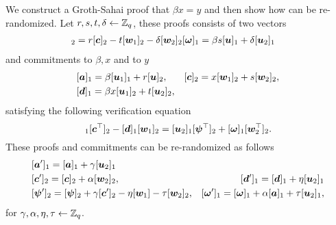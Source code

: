 
We construct a Groth-Sahai proof that $\beta x=y$ and then show how can be re-randomized. Let $r,s,t,\delta\gets\mathbb{Z}_q$, these proofs  consists of two vectors
\begin{align}
[&\vecb{\psi}]_2=r[\vecb{c}]_2-t[\vecb{w}_1]_2-\delta[\vecb{w}_2]_2 &[\vecb{\omega}]_1 =\beta s[\vecb{u}]_1+\delta[\vecb{u}_2]_1
\label{eq:wi-proofs}
\end{align}
and commitments to $\beta,x$ and to $y$
\begin{align*}
&[{\boldsymbol{a}}]_1 = \beta[{\boldsymbol{u}}_1]_1 + r[{\boldsymbol{u}}]_2, &[{\boldsymbol{c}}]_2= x[{\boldsymbol{w}}_1]_2+s[{\boldsymbol{w}}_2]_2,\\
&[{\boldsymbol{d}}]_1 =\beta x[{\boldsymbol{u}}_1]_2 + t[{\boldsymbol{u}}_2]_2,
\end{align*}
satisfying the following verification equation
\begin{equation}
[\vecb{a}]_1[\vecb{c}^\top]_2-[\vecb{d}]_1[\vecb{w}_1]_2 =[\vecb{u}_2]_1[\vecb{\psi}^\top]_2+[\vecb{\omega}]_1[\vecb{w}^\top_2]_2.
\label{eq:wi-verif}
\end{equation}
These proofs and commitments can be re-randomized as follows
\begin{align}
&[{\boldsymbol{a}}']_1 = [{\boldsymbol{a}}]_1 + \gamma[{\boldsymbol{u}}_2]_1 \nonumber\\
&[{\boldsymbol{c}}']_2= [{\boldsymbol{c}}]_2 + \alpha[{\boldsymbol{w}}_2]_2, &[{\boldsymbol{d}}']_1 =[{\boldsymbol{d}}]_1 + \eta[{\boldsymbol{u}}_2]_1 \nonumber\\
&[{\boldsymbol{\psi}}']_2=[{\boldsymbol{\psi}}]_2+\gamma[{\boldsymbol{c}}']_2 - \eta[{\boldsymbol{w}}_1]-\tau[{\boldsymbol{w}}_2]_2, & [{\boldsymbol{\omega}}']_1 = [{\boldsymbol{\omega}}]_1 + \alpha[{\boldsymbol{a}}]_1+\tau[{\boldsymbol{u}}_2]_1,
\label{eq:wi-rerand}
\end{align}
for $\gamma,\alpha,\eta,\tau\gets\mathbb{Z}_q$.

